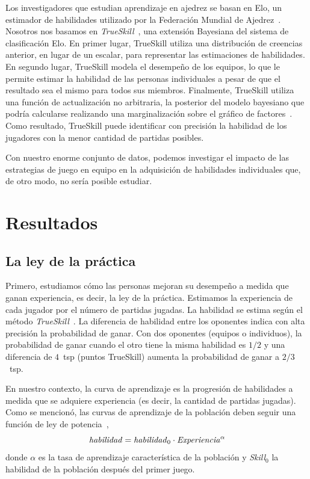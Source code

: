 \documentclass[a4paper,11pt]{book}
\theoremstyle{definition}
\begin{document}
Los investigadores que estudian aprendizaje en ajedrez se basan en Elo, un estimador de habilidades utilizado por la Federaci\'on Mundial de Ajedrez~\cite{glickman1995-guideToChessRatings,glickman2001}.
%
Nosotros nos basamos en \emph{TrueSkill}~\cite{Herbrich2007}, una extensi\'on Bayesiana del sistema de clasificaci\'on Elo.
%
En primer lugar, TrueSkill utiliza una distribuci\'on de creencias anterior, en lugar de un escalar, para representar las estimaciones de habilidades.
%
En segundo lugar, TrueSkill modela el desempeño de los equipos, lo que le permite estimar la habilidad de las personas individuales a pesar de que el resultado sea el mismo para todos sus miembros.
%
Finalmente, TrueSkill utiliza una funci\'on de actualizaci\'on no arbitraria, la posterior del modelo bayesiano que podr\'ia calcularse realizando una marginalizaci\'on sobre el gráfico de factores~\cite{Kschischang2001}.
%
Como resultado, TrueSkill puede identificar con precisi\'on la habilidad de los jugadores con la menor cantidad de partidas posibles.


Con nuestro enorme conjunto de datos, podemos investigar el impacto de las estrategias de juego en equipo en la adquisici\'on de habilidades individuales que, de otro modo, no ser\'ia posible estudiar.

\section{Resultados}

\subsection{La ley de la práctica}

Primero, estudiamos c\'omo las personas mejoran su desempeño a medida que ganan experiencia, es decir, la ley de la práctica.
%
Estimamos la experiencia de cada jugador por el n\'umero de partidas jugadas.
%
La habilidad se estima seg\'un el método \emph{TrueSkill}~\cite{Herbrich2007}.
%
La diferencia de habilidad entre los oponentes indica con alta precisi\'on la probabilidad de ganar.
%
Con dos oponentes (equipos o individuos), la probabilidad de ganar cuando el otro tiene la misma habilidad es $1/2$ y una diferencia de $4$~tsp (puntos TrueSkill) aumenta la probabilidad de ganar a $2/3$~tsp.


En nuestro contexto, la curva de aprendizaje es la progresi\'on de habilidades a medida que se adquiere experiencia (es decir, la cantidad de partidas jugadas).
%
Como se mencion\'o, las curvas de aprendizaje de la poblaci\'on deben seguir una funci\'on de ley de potencia~\cite{Newell1981},
%
\begin{equation}\label{lawOfPractice}
   \text{\emph{habilidad}} = \text{\emph{habilidad}}_0 \cdot \text{\emph{Experiencia}}^{\alpha}
\end{equation}
%
donde $\alpha$ es la tasa de aprendizaje caracter\'istica de la poblaci\'on y \emph{Skill}$_0$ la habilidad de la poblaci\'on después del primer juego.
\end{document}
